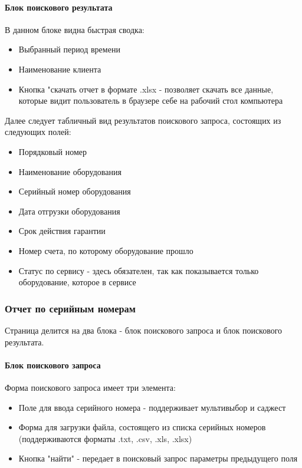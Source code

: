 \documentclass[DIV=calc, paper=a4, fontsize=11pt]{scrartcl} %
\newcommand{\AcceptedFormats}{.txt, .csv, .xls, .xlsx}
\begin{document}
\paragraph{Блок поискового результата}
В данном блоке видна быстрая сводка:

\begin{itemize}
	\item Выбранный период времени
	\item Наименование клиента
	\item Кнопка "скачать отчет в формате .xlsx - позволяет скачать все данные, которые видит пользователь в браузере себе на рабочий стол компьютера
\end{itemize}

Далее следует табличный вид результатов поискового запроса, состоящих из следующих полей:

\begin{itemize}
	\item Порядковый номер
	\item Наименование оборудования
	\item Серийный номер оборудования
	\item Дата отгрузки оборудования
	\item Срок действия гарантии
	\item Номер счета, по которому оборудование прошло
	\item Статус по сервису - здесь обязателен, так как показывается только оборудование, которое в сервисе
\end{itemize}


\subsubsection{Отчет по серийным номерам}

Страница делится на два блока - блок поискового запроса и блок поискового результата.
\paragraph{Блок поискового запроса}
Форма поискового запроса имеет три элемента:

\begin{itemize}
	\item Поле для ввода серийного номера  - поддерживает мультивыбор и саджест
	\item Форма для загрузки файла, состоящего из списка серийных номеров (поддерживаются форматы \AcceptedFormats)
	\item Кнопка "найти" - передает в поисковый запрос параметры предыдущего поля
\end{itemize}
\end{document}
